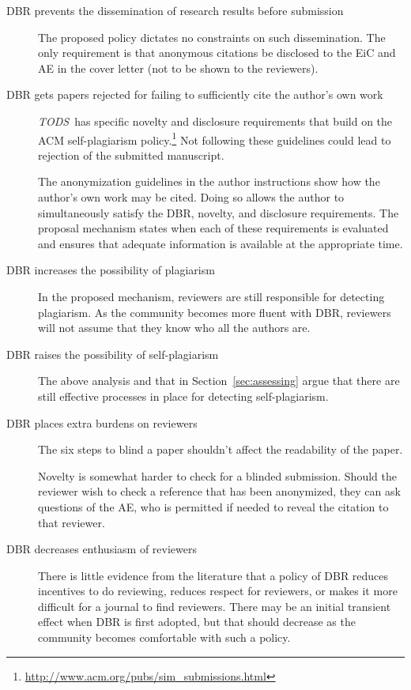 \documentclass[acmtods,acmnow]{acmtrans2m}
\newcommand{\tods}{{\em TODS\/}}
\begin{document}
\begin{description}
\item[DBR prevents the dissemination of research results before submission]
The proposed policy dictates no constraints on such dissemination.
The only requirement is that anonymous citations be disclosed to the EiC and
AE in the cover letter (not to be shown to the reviewers).

\item[DBR gets papers rejected for failing to sufficiently cite the author's
own work]
\tods\ has specific novelty and disclosure
requirements that build on the ACM self-plagiarism
policy.\footnote{\url{http://www.acm.org/pubs/sim_submissions.html}} Not
following these guidelines could lead to rejection of the submitted
manuscript.

The anonymization guidelines in the author instructions show how the
author's own work may be cited. Doing so allows the author to simultaneously
satisfy the DBR, novelty, and disclosure requirements. The proposal mechanism
states when each of these requirements is
evaluated and ensures that adequate information is available at the
appropriate time.

\item[DBR increases the possibility of plagiarism] In the proposed
mechanism, reviewers are still responsible for detecting plagiarism. As the
community becomes more fluent with DBR, reviewers will not assume that they
know who all the authors are.

\item[DBR raises the possibility of self-plagiarism] The above analysis and
that in
Section~\ref{sec:assessing} argue that there are still effective processes
in place for detecting self-plagiarism. 

\item[DBR places extra burdens on reviewers] The six steps to blind a paper
shouldn't affect the readability of the paper.

Novelty is somewhat harder to check for a blinded submission. Should the
reviewer wish to check a reference that has been anonymized, they can ask
questions of the AE, who is permitted if needed to reveal the citation to
that reviewer.

\item[DBR decreases enthusiasm of reviewers]
There is little evidence from the literature that a policy of DBR reduces
incentives to do reviewing, reduces respect for reviewers, or makes it more
difficult for a journal to find reviewers. There may be an initial transient
effect when DBR is first adopted, but that should decrease as the community
becomes comfortable with such a policy.


\end{description}
\end{document}
